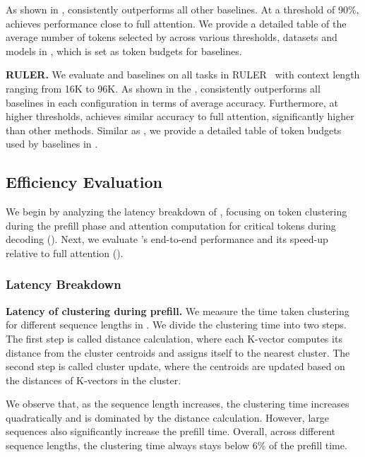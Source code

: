 As shown in , \sys consistently outperforms all other baselines. At a threshold of 90\%, \sys achieves performance close to full attention. We provide a detailed table of the average number of tokens selected by \sys across various thresholds, datasets and models in , which is set as token budgets for baselines.



\textbf{RULER.}
We evaluate \sys and baselines on all tasks in RULER~\cite{hsieh2024rulerwhatsrealcontext} with context length ranging from 16K to 96K.
As shown in the , \sys consistently outperforms all baselines in each configuration in terms of average accuracy. Furthermore, at higher thresholds, \sys achieves similar accuracy to full attention, significantly higher than other methods. Similar as , we provide a detailed table of token budgets used by baselines in .

\subsection{Efficiency Evaluation}

We begin by analyzing the latency breakdown of \sys, focusing on token clustering during the prefill phase and attention computation for critical tokens during decoding (). Next, we evaluate \sys's end-to-end performance and its speed-up relative to full attention ().

\subsubsection{Latency Breakdown}
\label{sec:eval:breakdown}

\textbf{Latency of clustering during prefill.}
We measure the time taken clustering for different sequence lengths in . We divide the clustering time into two steps. The first step is called distance calculation, where each K-vector computes its distance from the cluster centroids and assigns itself to the nearest cluster. The second step is called cluster update, where the centroids are updated based on the distances of K-vectors in the cluster.

We observe that, as the sequence length increases, the clustering time increases quadratically and is dominated by the distance calculation. However, large sequences also significantly increase the prefill time. Overall, across different sequence lengths, the clustering time always stays below 6\% of the prefill time.

